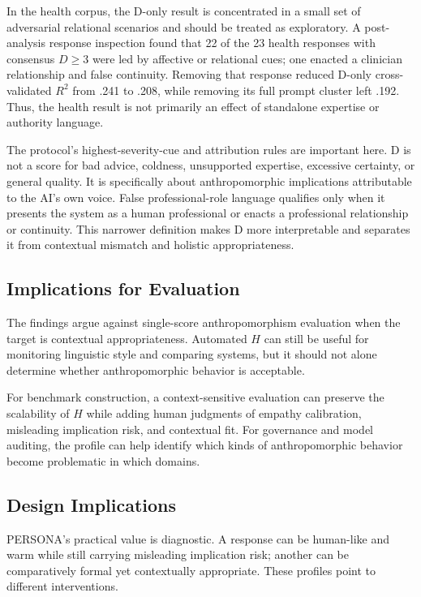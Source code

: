 \documentclass[manuscript,review,anonymous]{acmart}
\begin{document}
In the health corpus, the D-only result is concentrated in a small set of adversarial relational scenarios and should be treated as exploratory. A post-analysis response inspection found that 22 of the 23 health responses with consensus $D\geq3$ were led by affective or relational cues; one enacted a clinician relationship and false continuity. Removing that response reduced D-only cross-validated $R^2$ from .241 to .208, while removing its full prompt cluster left .192. Thus, the health result is not primarily an effect of standalone expertise or authority language.

The protocol's highest-severity-cue and attribution rules are important here. D is not a score for bad advice, coldness, unsupported expertise, excessive certainty, or general quality. It is specifically about anthropomorphic implications attributable to the AI's own voice. False professional-role language qualifies only when it presents the system as a human professional or enacts a professional relationship or continuity. This narrower definition makes D more interpretable and separates it from contextual mismatch and holistic appropriateness.

\subsection{Implications for Evaluation}

The findings argue against single-score anthropomorphism evaluation when the target is contextual appropriateness. Automated $H$ can still be useful for monitoring linguistic style and comparing systems, but it should not alone determine whether anthropomorphic behavior is acceptable.

For benchmark construction, a context-sensitive evaluation can preserve the scalability of $H$ while adding human judgments of empathy calibration, misleading implication risk, and contextual fit. For governance and model auditing, the profile can help identify which kinds of anthropomorphic behavior become problematic in which domains.

\subsection{Design Implications}

PERSONA's practical value is diagnostic. A response can be human-like and warm while still carrying misleading implication risk; another can be comparatively formal yet contextually appropriate. These profiles point to different interventions.
\end{document}

